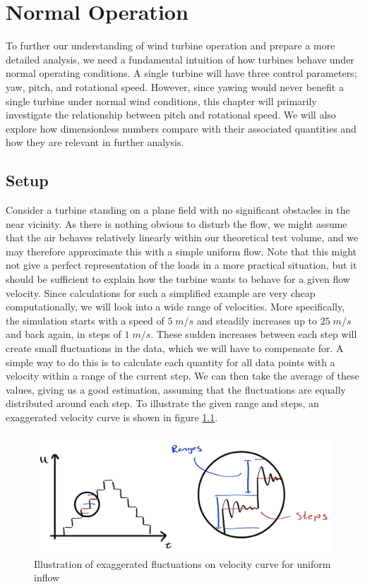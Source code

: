 \chapter{Normal Operation}

To further our understanding of wind turbine operation and prepare a more detailed analysis, we need a fundamental intuition of how turbines behave under normal operating conditions. A single turbine will have three control parameters; yaw, pitch, and rotational speed. However, since yawing would never benefit a single turbine under normal wind conditions, this chapter will primarily investigate the relationship between pitch and rotational speed. We will also explore how dimensionless numbers compare with their associated quantities and how they are relevant in further analysis. 

\section{Setup}

Consider a turbine standing on a plane field with no significant obstacles in the near vicinity. As there is nothing obvious to disturb the flow, we might assume that the air behaves relatively linearly within our theoretical test volume, and we may therefore approximate this with a simple uniform flow. Note that this might not give a perfect representation of the loads in a more practical situation, but it should be sufficient to explain how the turbine wants to behave for a given flow velocity. Since calculations for such a simplified example are very cheap computationally, we will look into a wide range of velocities. More specifically, the simulation starts with a speed of $5 \; m/s$ and steadily increases up to $25 \; m/s$ and back again, in steps of  $1 \; m/s$. These sudden increases between each step will create small fluctuations in the data, which we will have to compensate for. A simple way to do this is to calculate each quantity for all data points with a velocity within a range of the current step. We can then take the average of these values, giving us a good estimation, assuming that the fluctuations are equally distributed around each step. To illustrate the given range and steps, an exaggerated velocity curve is shown in figure \ref{fig:fluctuationillu}.

\begin{figure}[H]
    \centering
    \includegraphics[scale=0.24]{Illustrations/fluctuation_illu.jpg}
    \caption{Illustration of exaggerated fluctuations on velocity curve for uniform inflow}
    \label{fig:fluctuationillu}
\end{figure}

